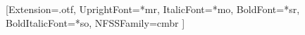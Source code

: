 \usepackage{polyglossia} %
\setmainlanguage{spanish} %
\usepackage{fontspec} %
\setsansfont{cmunb}[Extension=.otf,
UprightFont=*mr,
ItalicFont=*mo,
BoldFont=*sr, %
BoldItalicFont=*so, %
NFSSFamily=cmbr
]
\usepackage{cmbright} %
\usepackage{microtype} %
\usepackage{amsmath} %
\usepackage{amsfonts} %
\usepackage{amssymb} %